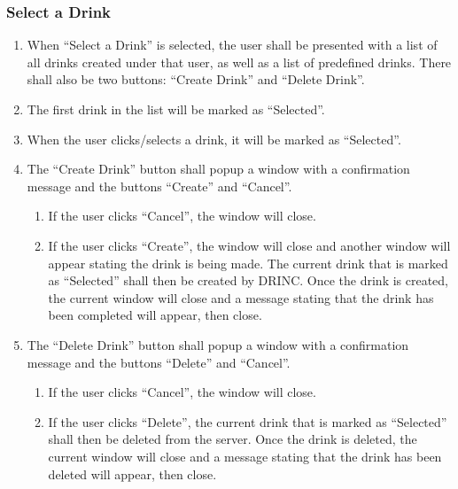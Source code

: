 {\subsubsection{Select a Drink}
\begin{enumerate}
	\item When ``Select a Drink'' is selected, the user shall be presented with a list of all drinks created under that user, as well as a list of predefined drinks. There shall also be two buttons: ``Create Drink'' and ``Delete Drink''.
	\item The first drink in the list will be marked as ``Selected''.
	\item When the user clicks/selects a drink, it will be marked as ``Selected''.
	\item The ``Create Drink'' button shall popup a window with a confirmation message and the buttons ``Create'' and ``Cancel''.
	\begin{enumerate}
		\item If the user clicks ``Cancel'', the window will close.
		\item If the user clicks ``Create'', the window will close and another window will appear stating the drink is being made. The current drink that is marked as ``Selected'' shall then be created by DRINC. Once the drink is created, the current window will close and a message stating that the drink has been completed will appear, then close.
	\end{enumerate}
	\item The ``Delete Drink'' button shall popup a window with a confirmation message and the buttons ``Delete'' and ``Cancel''.
	\begin{enumerate}
		\item If the user clicks ``Cancel'', the window will close.
		\item If the user clicks ``Delete'', the current drink that is marked as ``Selected'' shall then be deleted from the server. Once the drink is deleted, the current window will close and a message stating that the drink has been deleted will appear, then close.
	\end{enumerate}
\end{enumerate}

}
